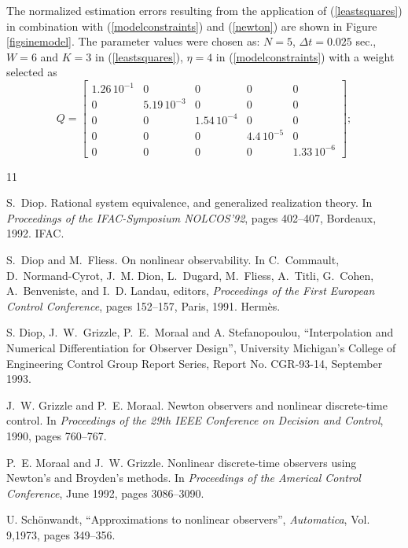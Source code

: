 The normalized estimation errors resulting
from the application of (\ref{leastsquares}) in combination with
(\ref{modelconstraints})
and (\ref{newton}) are shown in
Figure \ref{figsinemodel}.   The parameter values were chosen as: $N=5$, 
$\Delta t = 0.025$
sec., $W=6$ and $K=3$  in (\ref{leastsquares}), $\eta = 4$ in
(\ref{modelconstraints}) 
with a weight selected as
\begin{equation} Q = 
\left[ \begin{array}{ccccc} 1.26 \, 10^{-1} & 0 & 0 & 0 & 0 \\
0  & 5.19 \, 10^{-3}  & 0 & 0 & 0 \\
0 & 0 & 1.54 \, 10^{-4} & 0 & 0 \\
0 & 0 & 0 & 4.4 \, 10^{-5} & 0 \\
0 & 0 & 0 & 0 & 1.33 \, 10^{-6}
\end{array} \right];
\end{equation}

\begin{thebibliography}{11}


S.~Diop.
\newblock Rational system equivalence, and generalized realization theory.
\newblock In {\em Proceedings of the {I}FAC-{S}ymposium {N}OLCOS'92}, pages
  402--407, Bordeaux, 1992. IFAC.

S.~Diop and M.~Fliess.
\newblock On nonlinear observability.
\newblock In C.~Commault, D.~Normand-Cyrot, J.~M. Dion, L.~Dugard, M.~Fliess,
  A.~Titli, G.~Cohen, A.~Benveniste, and I.~D. Landau, editors, {\em
  Proceedings of the {F}irst {E}uropean {C}ontrol {C}onference}, pages
  152--157, Paris, 1991. Herm{\`e}s.

S. Diop, J.\ W.\ Grizzle, 
P.\ E.\ Moraal and A. Stefanopoulou, ``Interpolation and Numerical 
Differentiation for Observer Design'', University Michigan's College of
Engineering Control Group Report Series,  Report No. CGR-93-14, September
1993.


J.~W. Grizzle and P.~E. Moraal.
\newblock Newton observers and nonlinear discrete-time control.
\newblock In {\em Proceedings of the 29th {I}EEE {C}onference on {D}ecision and
  {C}ontrol}, 1990, pages 760--767.

P.~E. Moraal and J.~W. Grizzle.
\newblock Nonlinear discrete-time observers using {N}ewton's and {B}royden's
  methods.
\newblock In {\em Proceedings of the {A}merical {C}ontrol {C}onference}, June
1992, pages 3086--3090.

U. Sch\"{o}nwandt, ``Approximations to nonlinear observers'', {\it Automatica},
Vol. 9,1973,  pages 349--356.

\end{thebibliography}





